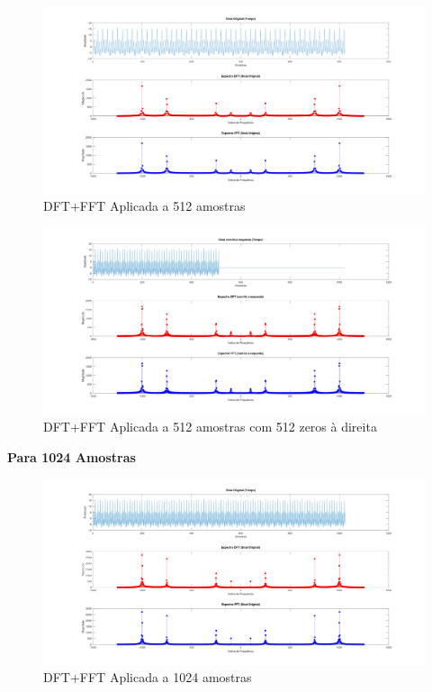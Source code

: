\begin{figure}[H]
    \centering
    \includegraphics[width=1\linewidth]{03_experimental_analysis//assets/plot_results/512_samples_dft_fft.png}
    \caption{DFT+FFT Aplicada a 512 amostras}
    \label{fig:signal_512samples_fft-dft}
\end{figure}

\begin{figure}[H]
    \centering
    \includegraphics[width=1\linewidth]{03_experimental_analysis//assets/plot_results/512_samples_dft_fft_padded.png}
    \caption{DFT+FFT Aplicada a 512 amostras com 512 zeros à direita}
    \label{fig:signal_512samples_fft-dft_padded}
\end{figure}

\textbf{Para 1024 Amostras}

\begin{figure}[H]
    \centering
    \includegraphics[width=1\linewidth]{03_experimental_analysis//assets/plot_results/1024_samples_dft_fft.png}
    \caption{DFT+FFT Aplicada a 1024 amostras}
    \label{fig:signal_1024samples_fft-dft}
\end{figure}

